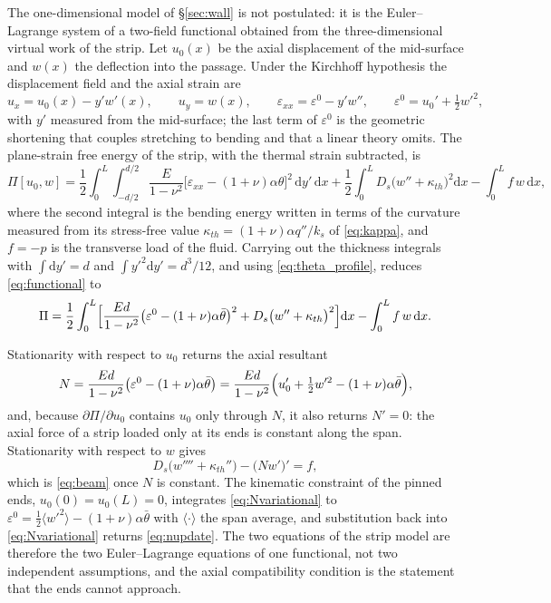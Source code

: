 \documentclass[11pt,a4paper]{article}
\newcommand{\eps}{\varepsilon}
\newcommand{\dd}{\mathrm{d}}
\begin{document}
The one-dimensional model of \S\ref{sec:wall} is not postulated: it is the Euler--Lagrange
system of a two-field functional obtained from the three-dimensional virtual work of the
strip. Let $u_0(x)$ be the axial displacement of the mid-surface and $w(x)$ the deflection
into the passage. Under the Kirchhoff hypothesis the displacement field and the axial strain
are
\begin{equation}
u_x=u_0(x)-y'w'(x),\qquad u_y=w(x),\qquad
\eps_{xx}=\eps^{0}-y'w'',\qquad
\eps^{0}=u_0'+\tfrac12 w'^2 ,
\label{eq:kirchhoff}
\end{equation}
with $y'$ measured from the mid-surface; the last term of $\eps^{0}$ is the geometric
shortening that couples stretching to bending and that a linear theory omits. The
plane-strain free energy of the strip, with the thermal strain subtracted, is
\begin{equation}
\Pi[u_0,w]=\frac12\int_0^L\int_{-d/2}^{d/2}
\frac{E}{1-\nu^2}\bigl[\eps_{xx}-(1+\nu)\alpha\theta\bigr]^2\,\dd y'\,\dd x
+\frac12\int_0^L D_s\bigl(w''+\kappa_{th}\bigr)^2\dd x-\int_0^L f\,w\,\dd x ,
\label{eq:functional}
\end{equation}
where the second integral is the bending energy written in terms of the curvature measured
from its stress-free value $\kappa_{th}=(1+\nu)\alpha q''/k_s$ of \eqref{eq:kappa}, and
$f=-p$ is the transverse load of the fluid. Carrying out the thickness integrals with
$\int\dd y'=d$ and $\int y'^2\dd y'=d^3/12$, and using \eqref{eq:theta_profile}, reduces
\eqref{eq:functional} to
\begin{equation}
\Pi=\frac12\int_0^L\Bigl[\frac{Ed}{1-\nu^2}\bigl(\eps^{0}-(1+\nu)\alpha\bar\theta\bigr)^2
+D_s\bigl(w''+\kappa_{th}\bigr)^2\Bigr]\dd x-\int_0^L f\,w\,\dd x .
\label{eq:functional1d}
\end{equation}

Stationarity with respect to $u_0$ returns the axial resultant
\begin{equation}
N=\frac{Ed}{1-\nu^2}\bigl(\eps^{0}-(1+\nu)\alpha\bar\theta\bigr)
=\frac{Ed}{1-\nu^2}\Bigl(u_0'+\tfrac12 w'^2-(1+\nu)\alpha\bar\theta\Bigr),
\label{eq:Nvariational}
\end{equation}
and, because $\partial\Pi/\partial u_0$ contains $u_0$ only through $N$, it also returns
$N'=0$: the axial force of a strip loaded only at its ends is constant along the span.
Stationarity with respect to $w$ gives
\begin{equation}
D_s\bigl(w''''+\kappa_{th}''\bigr)-\bigl(Nw'\bigr)'=f ,
\label{eq:EL}
\end{equation}
which is \eqref{eq:beam} once $N$ is constant. The kinematic constraint of the pinned ends,
$u_0(0)=u_0(L)=0$, integrates \eqref{eq:Nvariational} to
$\eps^{0}=\tfrac12\langle w'^2\rangle-(1+\nu)\alpha\bar\theta$ with
$\langle\cdot\rangle$ the span average, and substitution back into \eqref{eq:Nvariational}
returns \eqref{eq:nupdate}. The two equations of the strip model are therefore the two
Euler--Lagrange equations of one functional, not two independent assumptions, and the axial
compatibility condition is the statement that the ends cannot approach.
\end{document}

